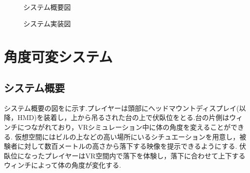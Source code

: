 \documentclass[uplatex]{jsarticle}
\begin{document}
 \begin{figure}[tb]
  \centering
  \caption{システム概要図}
  \label{fig:about_system}

  \centering
  \caption{システム実装図}
  \label{fig:build_system}

\end{figure}

\section{角度可変システム}
\subsection{システム概要}
システム概要の図をに示す.プレイヤーは頭部にヘッドマウントディスプレイ(以降，HMD)を装着し，上から吊るされた台の上で伏臥位をとる.台の片側はウィンチにつながれており，VRシミュレーション中に体の角度を変えることができる.
仮想空間にはビルの上などの高い場所にいるシチュエーションを用意し，被験者に対して数百メートルの高さから落下する映像を提示できるようにする.
伏臥位になったプレイヤーはVR空間内で落下を体験し，落下に合わせて上下するウィンチによって体の角度が変化する.
\end{document}
